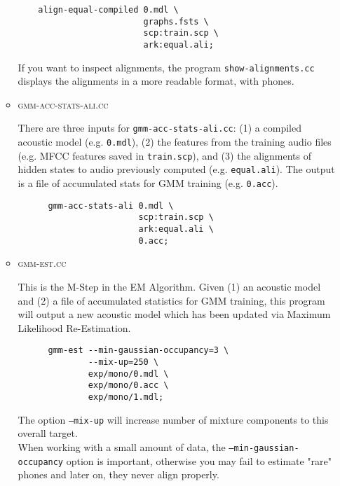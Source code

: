 \documentclass[10pt,a4paper]{article}
\begin{document}
\begin{itemize}
\begin{itemize}
    \begin{verbatim}
    align-equal-compiled 0.mdl \
                         graphs.fsts \
                         scp:train.scp \
                         ark:equal.ali;
    \end{verbatim}

If you want to inspect alignments, the program \texttt{show-alignments.cc} displays the alignments in a more readable format, with phones.\\

  \item \textsc{gmm-acc-stats-ali.cc}

    There are three inputs for \texttt{gmm-acc-stats-ali.cc}: (1) a compiled acoustic model (e.g. \texttt{0.mdl}), (2) the features from the training audio files (e.g. MFCC features saved in \texttt{train.scp}), and (3) the alignments of hidden states to audio previously computed (e.g. \texttt{equal.ali}). The output is a file of accumulated stats for GMM training (e.g. \texttt{0.acc}).\\

    \begin{verbatim}
      gmm-acc-stats-ali 0.mdl \
                        scp:train.scp \
                        ark:equal.ali \
                        0.acc;
    \end{verbatim} 

  \item \textsc{gmm-est.cc}

    This is the M-Step in the EM Algorithm. Given (1) an acoustic model and (2) a file of accumulated statistics for GMM training, this program will output a new acoustic model which has been updated via Maximum Likelihood Re-Estimation.\\
    
    \begin{verbatim}
      gmm-est --min-gaussian-occupancy=3 \
              --mix-up=250 \
              exp/mono/0.mdl \
              exp/mono/0.acc \
              exp/mono/1.mdl; 
    \end{verbatim}

    The option \texttt{--mix-up} will increase number of mixture components to this overall target.\\

    When working with a small amount of data, the \texttt{--min-gaussian-occupancy} option is important, otherwise you may fail to estimate "rare" phones and later on, they never align properly.


\end{itemize}
\end{itemize}
\end{document}
